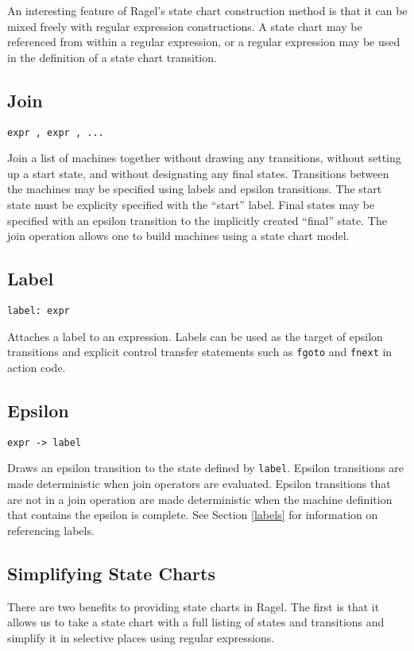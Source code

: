 \documentclass[letterpaper,11pt,oneside]{book}
\newcommand{\verbspace}{\vspace{10pt}}
\begin{document}
An interesting feature of Ragel's state chart construction method is that it
can be mixed freely with regular expression constructions. A state chart may be
referenced from within a regular expression, or a regular expression may be
used in the definition of a state chart transition.

\subsection{Join}

\verb|expr , expr , ...|
\verbspace

Join a list of machines together without
drawing any transitions, without setting up a start state, and without
designating any final states. Transitions between the machines may be specified
using labels and epsilon transitions. The start state must be explicity
specified with the ``start'' label. Final states may be specified with an
epsilon transition to the implicitly created ``final'' state. The join
operation allows one to build machines using a state chart model.

\subsection{Label}

\verb|label: expr| 
\verbspace

Attaches a label to an expression. Labels can be
used as the target of epsilon transitions and explicit control transfer
statements such as \verb|fgoto| and \verb|fnext| in action
code.

\subsection{Epsilon}

\verb|expr -> label| 
\verbspace

Draws an epsilon transition to the state defined
by \verb|label|.  Epsilon transitions are made deterministic when join
operators are evaluated. Epsilon transitions that are not in a join operation
are made deterministic when the machine definition that contains the epsilon is
complete. See Section \ref{labels} for information on referencing labels.

\subsection{Simplifying State Charts}

There are two benefits to providing state charts in Ragel. The first is that it
allows us to take a state chart with a full listing of states and transitions
and simplify it in selective places using regular expressions.
\end{document}
